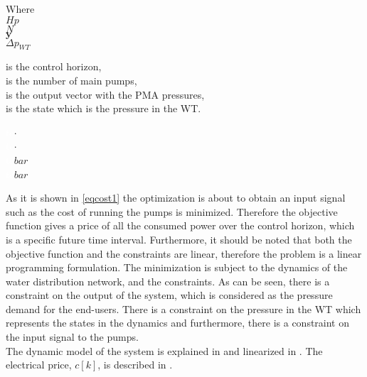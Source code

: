  \begin{minipage}[t]{0.24\textwidth}
 Where\\
 \hspace*{8mm} $Hp$ \\
 \hspace*{8mm} $N$ \\
 \hspace*{8mm} $\pmb{y}$ \\
 \hspace*{8mm} $\Delta p_{WT}$ 
 \end{minipage}
 \begin{minipage}[t]{0.63\textwidth}
 \vspace*{2mm}
 is the control horizon, \\
 is the number of main pumps,\\
 is the output vector with the PMA pressures,\\
 is the state which is the pressure in the WT.
 \end{minipage}
 \begin{minipage}[t]{0.10\textwidth}
 \vspace*{2mm}
 \textcolor{White}{te}$\unit{\cdot}$\\
 \textcolor{White}{te}$\unit{\cdot}$\\
 \textcolor{White}{te}$\unit{bar}$\\
 \textcolor{White}{te}$\unit{bar}$
 \end{minipage}
 
As it is shown in \eqref{eqcost1} the optimization is about to obtain an input signal such as the cost of running the pumps is minimized. Therefore the objective function gives a price of all the consumed power over the control horizon, which is a specific future time interval. Furthermore, it should be noted that both the objective function and the constraints are linear, therefore the problem is a linear programming formulation. The minimization is subject to the dynamics of the water distribution network, and the constraints. As can be seen, there is a constraint on the output of the system, which is considered as the pressure demand for the end-users. There is a constraint on the pressure in the WT which represents the states in the dynamics and furthermore, there is a constraint on the input signal to the pumps. 
\\
The dynamic model of the system is explained in  and linearized in . The electrical price, $c[k]$, is described in . %

